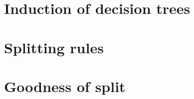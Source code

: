 
\section{Induction of decision trees}
\label{sec:3:induction}


\section{Splitting rules}
\label{sec:3:splitting-rules}


\section{Goodness of split}
\label{sec:3:criteria}


